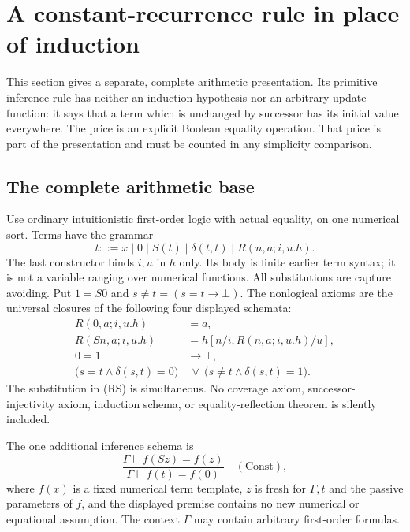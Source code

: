 \section{A constant-recurrence rule in place of induction}
\label{sec:constancy-with-split}

This section gives a separate, complete arithmetic presentation.  Its
primitive inference rule has neither an induction hypothesis nor an
arbitrary update function: it says that a term which is unchanged by
successor has its initial value everywhere.  The price is an explicit
Boolean equality operation.  That price is part of the presentation and
must be counted in any simplicity comparison.

\subsection{The complete arithmetic base}

Use ordinary intuitionistic first-order logic with actual equality, on
one numerical sort.  Terms have the grammar
\[
 t ::= x\mid 0\mid S(t)\mid \delta(t,t)
          \mid R(n,a;i,u.h).
\]
The last constructor binds $i,u$ in $h$ only.  Its body is finite earlier
term syntax; it is not a variable ranging over numerical functions.
All substitutions are capture avoiding.  Put $1=S0$ and
$s\ne t=(s=t\to\bot)$.  The nonlogical axioms are the universal closures
of the following four displayed schemata:
\begin{align}
 R(0,a;i,u.h)&=a, \tag{R0}\label{eq:const-r0}\\
 R(Sn,a;i,u.h)&=h[n/i,R(n,a;i,u.h)/u],
       \tag{RS}\label{eq:const-rs}\\
 0=1&\longrightarrow\bot, \tag{Sep}\label{eq:const-sep}\\
 \bigl(s=t\land\delta(s,t)=0\bigr)&\ \lor\
 \bigl(s\ne t\land\delta(s,t)=1\bigr).
       \tag{Split}\label{eq:const-split}
\end{align}
The substitution in \textup{(RS)} is simultaneous.  No coverage axiom,
successor-injectivity axiom, induction schema, or equality-reflection
theorem is silently included.

The one additional inference schema is
\[
 \frac{\Gamma\vdash f(Sz)=f(z)}
      {\Gamma\vdash f(t)=f(0)}\quad(\mathrm{Const}),
 \tag{Const}\label{eq:const-rule}
\]
where $f(x)$ is a fixed numerical term template, $z$ is fresh for
$\Gamma,t$ and the passive parameters of $f$, and the displayed premise
contains no new numerical or equational assumption.  The context
$\Gamma$ may contain arbitrary first-order formulas.

